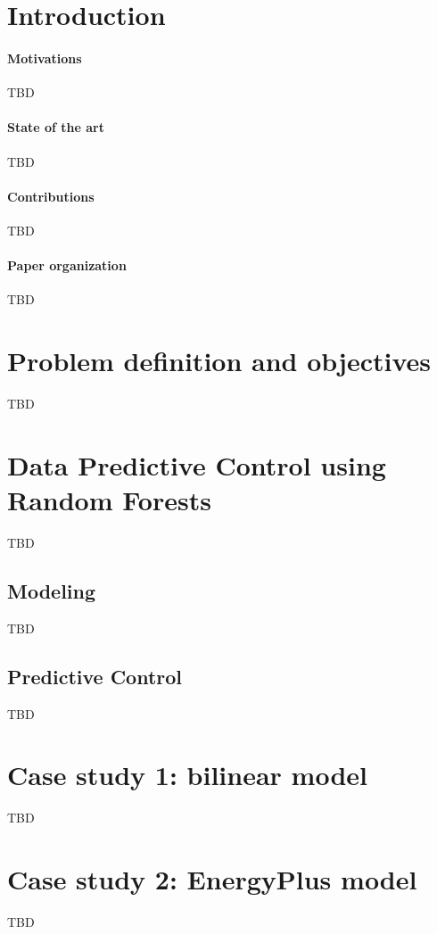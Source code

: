 \section{Introduction}

\paragraph{Motivations} TBD

\paragraph{State of the art} TBD

\paragraph{Contributions} TBD

\paragraph{Paper organization} TBD

\section{Problem definition and objectives} TBD

\section{Data Predictive Control using Random Forests} TBD

\subsection{Modeling} TBD

\subsection{Predictive Control} TBD

\section{Case study 1: bilinear model} TBD

\section{Case study 2: EnergyPlus model} TBD

